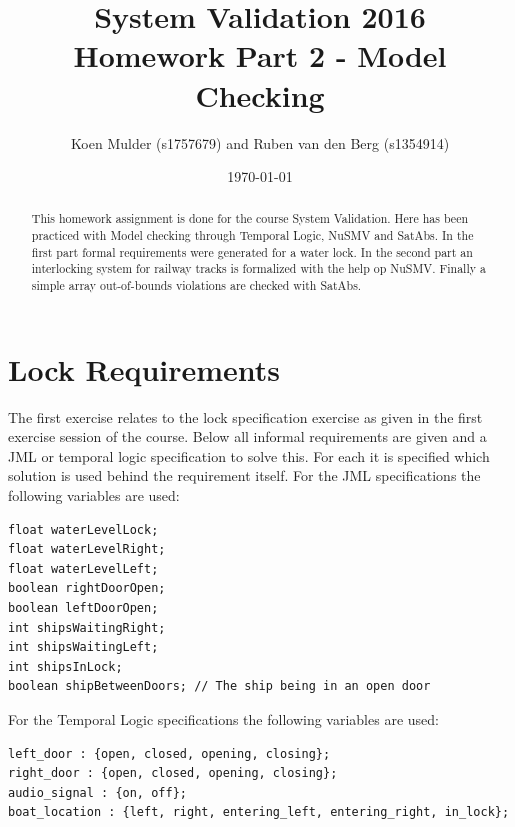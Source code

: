 \documentclass[a4paper]{article}
\title{System Validation 2016 \\ Homework Part 2 - Model Checking}
\author{Koen Mulder (s1757679) and Ruben van den Berg (s1354914)}
\date{\today}
\begin{document}
	\maketitle
	
	\begin{abstract}
		This homework assignment is done for the course System Validation. Here has been practiced with Model checking through Temporal Logic, NuSMV and SatAbs. In the first part formal requirements were generated for a water lock. In the second part an interlocking system for railway tracks is formalized with the help op NuSMV. Finally a simple array out-of-bounds violations are checked with SatAbs. 
	\end{abstract}
	
	\section{Lock Requirements}
	The first exercise relates to the lock specification exercise as given in the first exercise session of the course. Below all informal requirements are given and a JML or temporal logic specification to solve this. For each it is specified which solution is used behind the requirement itself.
	For the JML specifications the following variables are used:
	\begin{lstlisting}
float waterLevelLock;
float waterLevelRight;
float waterLevelLeft;
boolean rightDoorOpen;
boolean leftDoorOpen;
int shipsWaitingRight;
int shipsWaitingLeft;
int shipsInLock;
boolean shipBetweenDoors; // The ship being in an open door
	\end{lstlisting}
	For the Temporal Logic specifications the following variables are used:
	\begin{lstlisting}
left_door : {open, closed, opening, closing};
right_door : {open, closed, opening, closing};
audio_signal : {on, off};
boat_location : {left, right, entering_left, entering_right, in_lock};
	\end{lstlisting}
\end{document}
